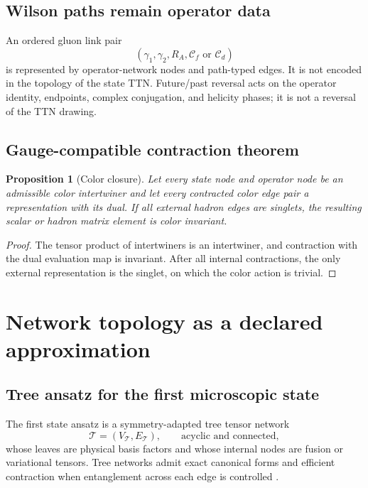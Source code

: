 \documentclass[11pt]{article}
\newtheorem{proposition}[definition]{Proposition}
\newcommand{\cC}{\mathcal C}
\newcommand{\cT}{\mathcal T}
\begin{document}
\subsection{Wilson paths remain operator data}

An ordered gluon link pair
\begin{equation}
 \left(\gamma_1,\gamma_2,R_A,\cC_f\text{ or }\cC_d\right)
\label{eq:ordered-link-network}
\end{equation}
is represented by operator-network nodes and path-typed edges.  It is not
encoded in the topology of the state TTN.  Future/past reversal acts on the
operator identity, endpoints, complex conjugation, and helicity phases; it is
not a reversal of the TTN drawing.

\subsection{Gauge-compatible contraction theorem}

\begin{proposition}[Color closure]
Let every state node and operator node be an admissible color intertwiner and
let every contracted color edge pair a representation with its dual.  If all
external hadron edges are singlets, the resulting scalar or hadron matrix
element is color invariant.
\end{proposition}

\begin{proof}
The tensor product of intertwiners is an intertwiner, and contraction with the
dual evaluation map is invariant.  After all internal contractions, the only
external representation is the singlet, on which the color action is trivial.
\end{proof}

\section{Network topology as a declared approximation}
\label{sec:network-topology}

\subsection{Tree ansatz for the first microscopic state}

The first state ansatz is a symmetry-adapted tree tensor network
\begin{equation}
 \cT=(V_{\cT},E_{\cT}),
 \qquad
 \text{acyclic and connected},
\label{eq:tree-graph}
\end{equation}
whose leaves are physical basis factors and whose internal nodes are fusion or
variational tensors.  Tree networks admit exact canonical forms and efficient
contraction when entanglement across each edge is controlled
\cite{Shi2006,Gunst2018}.
\end{document}
